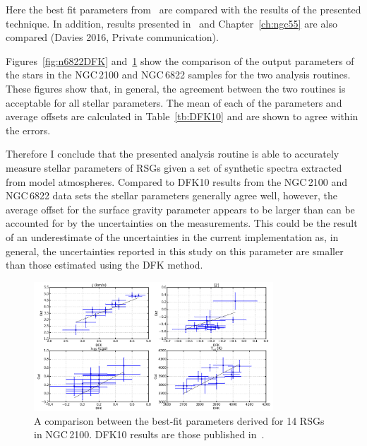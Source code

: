 Here the best fit parameters from~\cite{2015ApJ...803...14P} are compared with the results of the presented technique.
In addition, results presented in~\citep{2016arXiv160202702P} and Chapter~\ref{ch:ngc55} are also compared (Davies 2016, Private communication).

Figures~\ref{fig:n6822DFK} and~\ref{fig:n2100DFK} show the comparison of the output parameters of the stars in the NGC\,2100 and NGC\,6822 samples for the two analysis routines.
These figures show that, in general, the agreement between the two routines is acceptable for all stellar parameters.
The mean of each of the parameters and average offsets are calculated in Table~\ref{tb:DFK10} and are shown to agree within the errors.


Therefore I conclude that the presented analysis routine is able to accurately measure stellar parameters of RSGs given a set of synthetic spectra extracted from model atmospheres.
Compared to DFK10 results from the NGC\,2100 and NGC\,6822 data sets the stellar parameters generally agree well, however, the average offset for the surface gravity parameter appears to be larger than can be accounted for by the uncertainties on the measurements.
This could be the result of an underestimate of the uncertainties in the current implementation as, in general, the uncertainties reported in this study on this parameter are smaller than those estimated using the DFK method.

\begin{figure}
 \centering
 \includegraphics[width=0.80\textwidth]{JAnal/NGC2100-par-compare}
 \caption[The best-fit parameter comparison between the results presented Chapter~\ref{ch:ngc2100} and those of DFK10]{
A comparison between the best-fit parameters derived for 14 RSGs in NGC\,2100.
DFK10 results are those published in~\cite{2016arXiv160202702P}.
\label{fig:n2100DFK}
         }
\end{figure}

